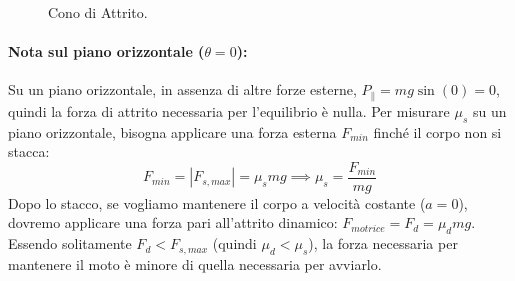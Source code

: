 \begin{figure}[h!]
\begin{minipage}{0.48\textwidth}
        \caption{Equilibrio su piano inclinato.}
    \end{minipage}
    \hfill
    \begin{minipage}{0.48\textwidth}
        \centering
        \caption{Cono di Attrito.}
    \end{minipage}
\end{figure}

\paragraph{Nota sul piano orizzontale ($\theta = 0$):}
Su un piano orizzontale, in assenza di altre forze esterne, $P_{\parallel} = m g \sin(0) = 0$, quindi la forza di attrito necessaria per l'equilibrio è nulla.
Per misurare $\mu_s$ su un piano orizzontale, bisogna applicare una forza esterna $F_{min}$ finché il corpo non si stacca:
\[ F_{min} = |F_{s,max}| = \mu_s m g \implies \mu_s = \frac{F_{min}}{m g} \]
Dopo lo stacco, se vogliamo mantenere il corpo a velocità costante ($a=0$), dovremo applicare una forza pari all'attrito dinamico: $F_{motrice} = F_d = \mu_d m g$. Essendo solitamente $F_d < F_{s,max}$ (quindi $\mu_d < \mu_s$), la forza necessaria per mantenere il moto è minore di quella necessaria per avviarlo.

